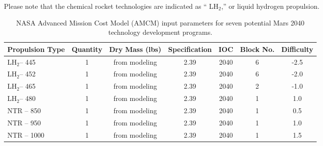 \documentclass[]{aiaa-pretty}
\begin{document}
Please note that the chemical rocket technologies are indicated as “ LH$_2$,” or liquid hydrogen propulsion.

\begin{table}[b]
\centering
\caption{NASA Advanced Mission Cost Model (AMCM) input parameters for seven potential Mars 2040 technology development programs.}
\label{tab:AMCM}
\begin{tabular}{lcccccc}
\textbf{Propulsion Type} & \multicolumn{1}{l}{\textbf{Quantity}} & \multicolumn{1}{l}{\textbf{Dry Mass (lbs)}} & \multicolumn{1}{l}{\textbf{Specification}} & \multicolumn{1}{l}{\textbf{IOC}} & \multicolumn{1}{l}{\textbf{Block No.}} & \multicolumn{1}{l}{\textbf{Difficulty}} \\\hline
 LH$_2$– 445                         & 1                                     & from modeling                               & 2.39                                       & 2040                                                      & 6                                      & -2.5                                    \\
 LH$_2$– 452                         & 1                                     & from modeling                               & 2.39                                       & 2040                                                      & 6                                      & -2.0                                    \\
 LH$_2$– 465                         & 1                                     & from modeling                               & 2.39                                       & 2040                                                      & 2                                      & -1.0                                    \\
 LH$_2$– 480                         & 1                                     & from modeling                               & 2.39                                       & 2040                                                      & 1                                      & 1.0                                     \\
NTR – 850                        & 1                                     & from modeling                               & 2.39                                       & 2040                                                      & 1                                      & 0.5                                     \\
NTR – 950                        & 1                                     & from modeling                               & 2.39                                       & 2040                                                      & 1                                      & 1.0                                     \\
NTR – 1000                       & 1                                     & from modeling                               & 2.39                                       & 2040                                                      & 1                                      & 1.5                                    
\end{tabular}
\end{table}
\end{document}
